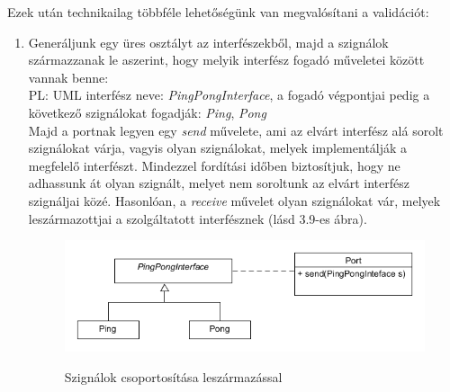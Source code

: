 \documentclass[a4paper,12pt]{report}
\begin{document}
Ezek után technikailag többféle lehetőségünk van megvalósítani a validációt: \\
\begin{enumerate}

\item Generáljunk egy üres osztályt az interfészekből, majd a szignálok származzanak le aszerint, hogy melyik interfész fogadó műveletei között vannak benne: \\
PL: UML interfész neve: \textit{PingPongInterface}, a fogadó végpontjai pedig a következő szignálokat fogadják: \textit{Ping}, \textit{Pong} \\
Majd a portnak legyen egy \textit{send} művelete, ami az elvárt interfész alá sorolt szignálokat várja, vagyis olyan szignálokat, melyek implementálják a megfelelő interfészt.
Mindezzel fordítási időben biztosítjuk, hogy ne adhassunk át olyan szignált, melyet nem soroltunk az elvárt interfész szignáljai közé. Hasonlóan, a \textit{receive} művelet olyan szignálokat vár, melyek leszármazottjai a szolgáltatott interfésznek (lásd 3.9-es ábra). \\

\begin{figure}[H]
\begin{center}
\includegraphics[scale=0.7]{inf_ver1.png} \\
\end{center}
\caption{Szignálok csoportosítása leszármazással}
\end{figure}


\end{enumerate}
\end{document}
